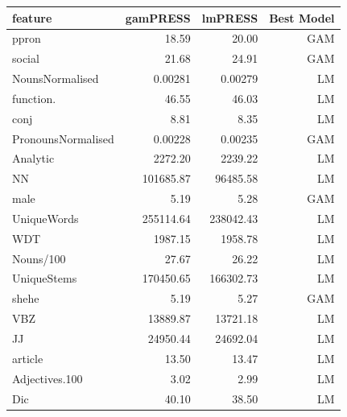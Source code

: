 \documentclass[12pt]{article}
\begin{document}
\begin{table}[H]
\centering
\begin{tabular}{| l | r | r | r |}
  \hline
feature & gamPRESS & lmPRESS & Best Model\\ 
  \hline
ppron & 18.59 & 20.00 & GAM\\ 
  social & 21.68 & 24.91 & GAM\\ 
  NounsNormalised & 0.00281 & 0.00279 & LM\\ 
  function. & 46.55 & 46.03 & LM\\ 
  conj & 8.81 & 8.35 & LM \\ 
  PronounsNormalised & 0.00228 & 0.00235 & GAM \\ 
  Analytic & 2272.20 & 2239.22 & LM\\ 
  NN & 101685.87 & 96485.58 & LM\\ 
  male & 5.19 & 5.28 & GAM\\ 
  UniqueWords & 255114.64 & 238042.43 & LM\\ 
  WDT & 1987.15 & 1958.78 & LM \\ 
  Nouns/100 & 27.67 & 26.22 & LM\\ 
  UniqueStems & 170450.65 & 166302.73 & LM \\ 
  shehe & 5.19 & 5.27 & GAM\\ 
  VBZ & 13889.87 & 13721.18 & LM\\ 
  JJ & 24950.44 & 24692.04 & LM\\ 
  article & 13.50 & 13.47 & LM\\ 
  Adjectives.100 & 3.02 & 2.99 & LM\\ 
  Dic & 40.10 & 38.50 & LM\\ 
   \hline
\end{tabular}
\end{table}
\end{document}
